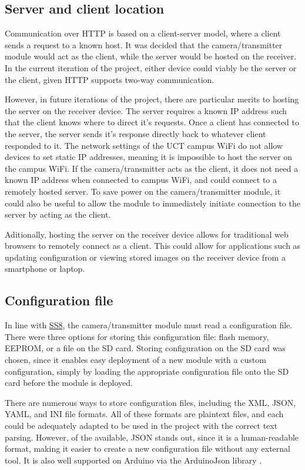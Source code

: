 \documentclass[class=report,11pt,crop=false]{standalone}
\begin{document}
\subsection{Server and client location}

Communication over HTTP is based on a client-server model, where a client sends a request to a known host. It was decided that the camera/transmitter module would act as the client, while the server would be hosted on the receiver. In the current iteration of the project, either device could viably be the server or the client, given HTTP supports two-way communication. 

However, in future iterations of the project, there are particular merits to hosting the server on the receiver device. The server requires a known IP address such that the client knows where to direct it's requests. Once a client has connected to the server, the server sends it's response directly back to whatever client responded to it. The network settings of the UCT campus WiFi do not allow devices to set static IP addresses, meaning it is impossible to host the server on the campus WiFi. If the camera/transmitter acts as the client, it does not need a known IP address when connected to campus WiFi, and could connect to a remotely hosted server. To save power on the camera/transmitter module, it could also be useful to allow the module to immediately initiate connection to the server by acting as the client. 

Aditionally, hosting the server on the receiver device allows for traditional web browsers to remotely connect as a client. This could allow for applications such as updating configuration or viewing stored images on the receiver device from a smartphone or laptop.

\subsection{Configuration file}

In line with \hyperlink{tab:firmware-requirements}{SS8}, the camera/transmitter module must read a configuration file. There were three options for storing this configuration file: flash memory, EEPROM, or a file on the SD card. Storing configuration on the SD card was chosen, since it enables easy deployment of a new module with a custom configuration, simply by loading the appropriate configuration file onto the SD card before the module is deployed.

There are numerous ways to store configuration files, including the XML, JSON, YAML, and INI file formats. All of these formats are plaintext files, and each could be adequately adapted to be used in the project with the correct text parsing. However, of the available, JSON stands out, since it is a human-readable format, making it easier to create a new configuration file without any external tool. It is also well supported on Arduino via the ArduinoJson library \cite{blanchon2019arduino}.
\end{document}
